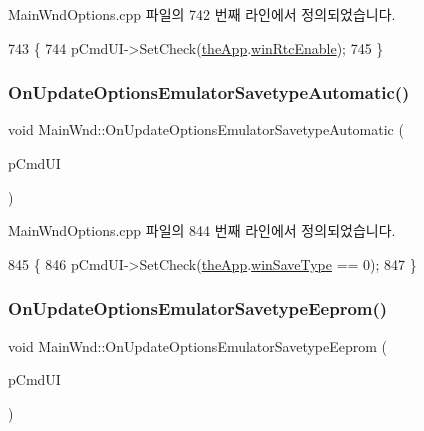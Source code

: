 Main\+Wnd\+Options.\+cpp 파일의 742 번째 라인에서 정의되었습니다.


\begin{DoxyCode}
743 \{
744   pCmdUI->SetCheck(\mbox{\hyperlink{_v_b_a_8cpp_a8095a9d06b37a7efe3723f3218ad8fb3}{theApp}}.\mbox{\hyperlink{class_v_b_a_ae289fc4c9e951e0844900c522c151170}{winRtcEnable}});
745 \}
\end{DoxyCode}
\mbox{\label{class_main_wnd_a5173da0c1314856915ce11a4c96fa69c}} 
\subsubsection{\texorpdfstring{On\+Update\+Options\+Emulator\+Savetype\+Automatic()}{OnUpdateOptionsEmulatorSavetypeAutomatic()}}
{\footnotesize\ttfamily void Main\+Wnd\+::\+On\+Update\+Options\+Emulator\+Savetype\+Automatic (\begin{DoxyParamCaption}\item[{C\+Cmd\+UI $\ast$}]{p\+Cmd\+UI }\end{DoxyParamCaption})\hspace{0.3cm}{\ttfamily [protected]}}



Main\+Wnd\+Options.\+cpp 파일의 844 번째 라인에서 정의되었습니다.


\begin{DoxyCode}
845 \{
846   pCmdUI->SetCheck(\mbox{\hyperlink{_v_b_a_8cpp_a8095a9d06b37a7efe3723f3218ad8fb3}{theApp}}.\mbox{\hyperlink{class_v_b_a_a70060f88010280739406c87ef66d036a}{winSaveType}} == 0);
847 \}
\end{DoxyCode}
\mbox{\label{class_main_wnd_ac10419115fc79d4d6cb8ff3c5bea5e36}} 
\subsubsection{\texorpdfstring{On\+Update\+Options\+Emulator\+Savetype\+Eeprom()}{OnUpdateOptionsEmulatorSavetypeEeprom()}}
{\footnotesize\ttfamily void Main\+Wnd\+::\+On\+Update\+Options\+Emulator\+Savetype\+Eeprom (\begin{DoxyParamCaption}\item[{C\+Cmd\+UI $\ast$}]{p\+Cmd\+UI }\end{DoxyParamCaption})\hspace{0.3cm}{\ttfamily [protected]}}



